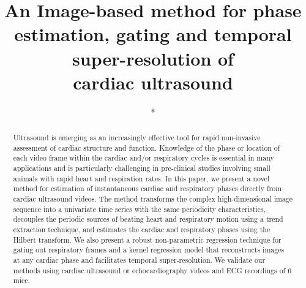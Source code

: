 \documentclass[runningheads,a4paper]{llncs}
\begin{document}
\mainmatter  %

\title{An Image-based method for phase estimation, gating and temporal super-resolution of \\cardiac ultrasound}


%
%

\author{*}
\authorrunning{*}   
\tocauthor{*}
\institute{*}

\maketitle

\begin{abstract}
Ultrasound is emerging as an increasingly effective tool for rapid non-invasive assessment of cardiac structure and function. Knowledge of the phase or location of each video frame within the cardiac and/or respiratory cycles is essential in many applications and is particularly challenging in pre-clinical studies involving small animals with rapid heart and respiration rates. In this paper, we present a novel method for estimation of instantaneous cardiac and respiratory phases directly from cardiac ultrasound videos. The method transforms the complex high-dimensional image sequence into a univariate time series with the same periodicity characteristics, decouples the periodic sources of beating heart and respiratory motion using a trend extraction technique, and estimates the cardiac and respiratory phases using the Hilbert transform. We also present a robust non-parametric regression technique for gating out respiratory frames and a kernel regression model that reconstructs images at any cardiac phase and facilitates temporal super-resolution. We validate our methods using cardiac ultrasound or echocardiography videos and ECG recordings of 6 mice.
\vspace{-0.3cm}
\end{abstract}
%
\end{document}

